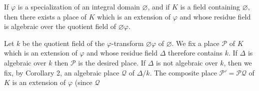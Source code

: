 If $\varphi$ is a specialization of an integral domain $\varnothing$, and if $K$ is a field containing $\varnothing$, then there exists a place of $K$ which is an extension of $\varphi$ and whose residue field is algebraic over the quotient field of $\varnothing\varphi$.

Let $k$ be the quotient field of the $\varphi$-transform $\varnothing\varphi$ of $\varnothing$. We fix a place $\mathcal{P}$ of $K$ which is an extension of $\varphi$ and whose residue field $\Delta$ therefore contains $k$. If $\Delta$ is algebraic over $k$ then $\mathcal{P}$ is the desired place. If $\Delta$ is not algebraic over $k$, then we fix, by Corollary 2, an algebraic place $\mathcal{Q}$ of $\Delta/k$. The composite place $\mathcal{P}' = \mathcal{P} \mathcal{Q}$ of $K$ is an extension of $\varphi$ (since $\mathcal{Q}$